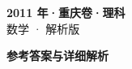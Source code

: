 \documentclass[zihao=-4, a4paper]{ctexart}
\begin{document}
\begin{center}
  {\Large\bfseries 2011 年·重庆卷·理科}\\[4pt]
  {\large 数学 · 解析版}
\end{center}
\medskip
{}

\clearpage
{}
\begin{center}{\Large\bfseries 参考答案与详细解析}\end{center}
\medskip

\end{document}

